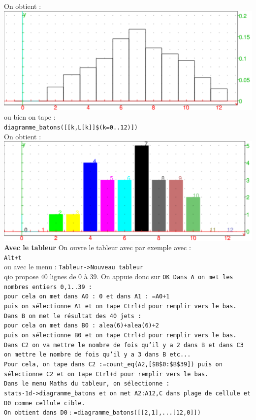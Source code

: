 \documentclass[a4paper,11pt]{book}
\begin{document}
On obtient :\\ 
\includegraphics[width=\textwidth]{troishist}\\
ou bien on tape :\\
{\tt diagramme\_batons([[k,L[k]]\$(k=0..12)])}\\
On obtient :\\ 
\includegraphics[width=\textwidth]{troisbat}\\
{\bf Avec le tableur}
On ouvre le tableur avec par exemple avec :\\
{\tt Alt+t}\\
 ou avec le menu :
{\tt Tableur->Nouveau tableur}\\
qio propose 40 lignes de 0 \`a 39. On appuie donc sur {\tt OK
Dans {\tt A} on met les nombres entiers 0,1..39 :\\
pour cela on met dans {\tt A0} : {\tt 0} et dans {\tt A1} : {\tt =A0+1} \\
puis on s\'electionne {\tt A1} et on tape {\tt Ctrl+d} pour remplir 
vers le bas.\\
Dans {\tt B} on met le r\'esultat des 40 jets :\\
pour cela on met dans {\tt B0} : {\tt alea(6)+alea(6)+2}\\
puis on s\'electionne {\tt B0} et on tape {\tt Ctrl+d} pour remplir vers 
le bas.\\
Dans {\tt C2} on va mettre le nombre de fois qu'il y a 2 dans {\tt B} et
dans {\tt C3} on mettre le nombre de fois qu'il y a 3 dans {\tt B} etc...\\
Pour cela, on tape dans {\tt C2} :{\tt =count\_eq(A2,[\$B\$0:\$B\$39])} puis 
on s\'electionne {\tt C2} et on tape {\tt Ctrl+d} pour remplir 
vers le bas.\\
Dans le menu {\tt Maths} du tableur, on s\'electionne :\\
{\tt stats-1d->diagramme\_batons} et on met {\tt A2:A12,C} dans plage de 
cellule et {\tt D0} comme cellule cible.\\
On obtient dans \tt D0} : {\tt =diagramme\_batons([[2,1],...[12,0]])} \\
\end{document}
